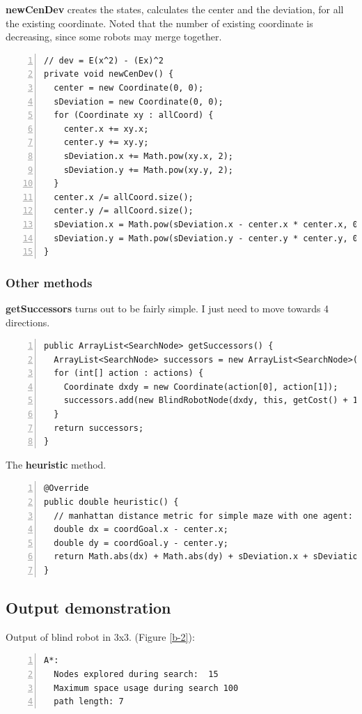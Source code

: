 \documentclass{article}
\begin{document}
\textbf{newCenDev} creates the states, calculates the center and the deviation, for all the existing coordinate. Noted that the number of existing coordinate is decreasing, since some robots may merge together.
\begin{lstlisting}[numbers=left]
// dev = E(x^2) - (Ex)^2
private void newCenDev() {
  center = new Coordinate(0, 0);
  sDeviation = new Coordinate(0, 0);
  for (Coordinate xy : allCoord) {
    center.x += xy.x;
    center.y += xy.y;
    sDeviation.x += Math.pow(xy.x, 2);
    sDeviation.y += Math.pow(xy.y, 2);
  }
  center.x /= allCoord.size();
  center.y /= allCoord.size();
  sDeviation.x = Math.pow(sDeviation.x - center.x * center.x, 0.5);
  sDeviation.y = Math.pow(sDeviation.y - center.y * center.y, 0.5);
}
\end{lstlisting}

\subsubsection{Other methods}

\textbf{getSuccessors} turns out to be fairly simple. I just need to move towards 4 directions. 
\begin{lstlisting}[numbers=left]
public ArrayList<SearchNode> getSuccessors() {
  ArrayList<SearchNode> successors = new ArrayList<SearchNode>();
  for (int[] action : actions) {
    Coordinate dxdy = new Coordinate(action[0], action[1]);
    successors.add(new BlindRobotNode(dxdy, this, getCost() + 1.0));
  }
  return successors;
}
\end{lstlisting}

The \textbf{heuristic} method.
\begin{lstlisting}[numbers=left]
@Override
public double heuristic() {
  // manhattan distance metric for simple maze with one agent:
  double dx = coordGoal.x - center.x;
  double dy = coordGoal.y - center.y;
  return Math.abs(dx) + Math.abs(dy) + sDeviation.x + sDeviation.y;
}
\end{lstlisting}











\subsection{Output demonstration}

Output of blind robot in 3x3. (Figure \ref{b-2}):
\begin{lstlisting}[numbers=left]
A*:  
  Nodes explored during search:  15
  Maximum space usage during search 100
  path length: 7
\end{lstlisting}
\end{document}
